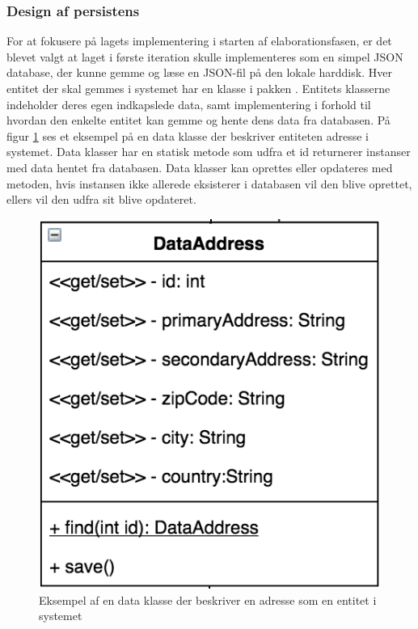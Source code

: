 \documentclass[../../main.tex]{subfiles}
\begin{document}
\subsubsection{Design af persistens}
For at fokusere på  lagets implementering i starten af elaborationsfasen, er det blevet valgt at  laget i første iteration skulle implementeres som en simpel JSON database, der kunne gemme og læse en JSON-fil på den lokale harddisk.
	Hver entitet der skal gemmes i systemet har en klasse i pakken . Entitets klasserne indeholder deres egen indkapslede data, samt implementering i forhold til hvordan den enkelte entitet kan gemme og hente dens data fra databasen. På figur \ref{fig:example_data_class} ses et eksempel på en data klasse der beskriver entiteten adresse i systemet. 
    Data klasser har en statisk  metode som udfra et id returnerer instanser med data hentet fra databasen. Data klasser kan oprettes eller opdateres med  metoden, hvis instansen ikke allerede eksisterer i databasen vil den blive oprettet, ellers vil den udfra sit  blive opdateret. \\

\begin{figure}[H]
  \centering
  \includegraphics[scale=.6]{figurer/example_data_class.png}
  \caption{Eksempel af en data klasse der beskriver en adresse som en entitet i systemet}
  \label{fig:example_data_class}
\end{figure}
\end{document}

